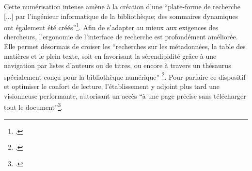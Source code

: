 Cette numérisation intense amène à la création d'une \enquote{plate-forme de recherche [...] par l'ingénieur informatique de la bibliothèque; des sommaires dynamiques ont également été créés}\footcite{balley4ExempleMediation2012}. Afin de s'adapter au mieux aux exigences des chercheurs, l'ergonomie de l'interface de recherche est profondément améliorée. Elle permet désormais de croiser les \enquote{recherches sur les métadonnées, la table des matières et le plein texte, soit en favorisant la sérendipidité grâce à une navigation par listes d'auteurs ou de titres, ou encore à travers un thésaurus spécialement conçu pour la bibliothèque numérique} \footcite{Arabesques_69_12_dossier_balleypdfEspaceTravail}. Pour parfaire ce dispositif et optimiser le confort de lecture, l'établissement y adjoint plus tard une visionneuse performante, autorisant un accès \enquote{à une page précise sans télécharger tout le document}\footnote{.}.